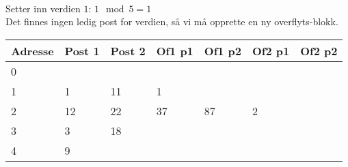 ~\\
Setter inn verdien $1$: $1 \mod 5 = 1$\\
Det finnes ingen ledig post for verdien, så vi må opprette en ny overflyts-blokk.\\
\begin{tabular}{|l|l|l|l|l|l|l|}
    \hline
    Adresse & Post 1 & Post 2 & Of1 p1 & Of1 p2 & Of2 p1 & Of2 p2 \\ \hline
    0       & ~      & ~      &\cellcolor{gray}&\cellcolor{gray}&\cellcolor{gray}&\cellcolor{gray}\\ \hline
    1       & 1      & 11     & 1      & ~      &\cellcolor{gray}&\cellcolor{gray}\\ \hline
    2       & 12     & 22     & 37     & 87     & 2      & ~      \\ \hline
    3       & 3      & 18     &\cellcolor{gray}&\cellcolor{gray}&\cellcolor{gray}&\cellcolor{gray}\\ \hline
    4       & 9      & ~      &\cellcolor{gray}&\cellcolor{gray}&\cellcolor{gray}&\cellcolor{gray}\\ \hline
\end{tabular}

